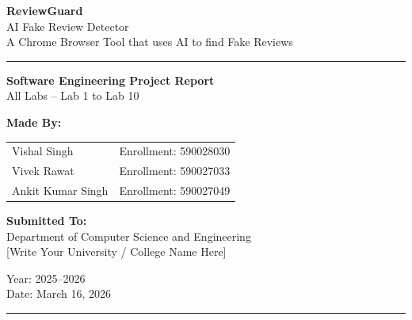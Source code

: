 \documentclass[10pt, a4paper]{report}
\begin{document}
\begin{titlepage}
  \centering
  \vspace*{1cm}

  {\Huge\bfseries\color{myblue} ReviewGuard}\\[6pt]
  {\Large\color{mygray} AI Fake Review Detector}\\[4pt]
  {\normalsize A Chrome Browser Tool that uses AI to find Fake Reviews}

  \vspace{0.5cm}
  \rule{\textwidth}{1.5pt}
  \vspace{0.3cm}

  {\LARGE\bfseries Software Engineering Project Report}\\[6pt]
  {\large All Labs -- Lab 1 to Lab 10}

  \vspace{1cm}


  \vspace{1cm}

  \textbf{Made By:}\\[6pt]
  \begin{tabular}{ll}
    Vishal Singh      & Enrollment: 590028030 \\
    Vivek Rawat       & Enrollment: 590027033 \\
    Ankit Kumar Singh & Enrollment: 590027049 \\
  \end{tabular}

  \vspace{0.8cm}
  \textbf{Submitted To:}\\[4pt]
  Department of Computer Science and Engineering\\
  {[Write Your University / College Name Here]}

  \vspace{0.8cm}
  {\large Year: 2025--2026}\\[4pt]
  {\normalsize Date: March 16, 2026}

  \vspace{0.5cm}
  \rule{\textwidth}{1.5pt}
\end{titlepage}
\end{document}
